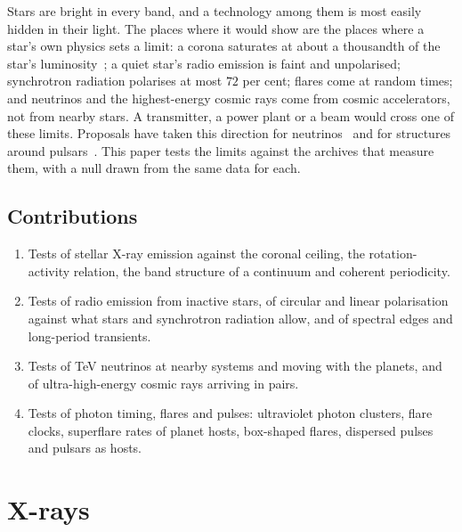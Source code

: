 \documentclass[3p,11pt]{elsarticle}
\begin{document}
Stars are bright in every band, and a technology among them is most easily hidden
in their light. The places where it would show are the places where a star's own
physics sets a limit: a corona saturates at about a thousandth of the star's
luminosity~\cite{Pizzolato2003,Wright2011}; a quiet star's radio emission is faint and
unpolarised; synchrotron radiation polarises at most $72$ per cent; flares come at
random times; and neutrinos and the highest-energy cosmic rays come from cosmic
accelerators, not from nearby stars. A transmitter, a power plant or a beam would cross
one of these limits. Proposals have taken this direction for neutrinos~\cite{Learned2009}
and for structures around pulsars~\cite{Osmanov2016}. This paper tests the limits
against the archives that measure them, with a null drawn from the same data for each.

\subsection{Contributions}
\begin{enumerate}[leftmargin=*,itemsep=1pt]
\item Tests of stellar X-ray emission against the coronal ceiling, the rotation-activity
relation, the band structure of a continuum and coherent periodicity.
\item Tests of radio emission from inactive stars, of circular and linear polarisation
against what stars and synchrotron radiation allow, and of spectral edges and long-period
transients.
\item Tests of TeV neutrinos at nearby systems and moving with the planets, and of
ultra-high-energy cosmic rays arriving in pairs.
\item Tests of photon timing, flares and pulses: ultraviolet photon clusters, flare
clocks, superflare rates of planet hosts, box-shaped flares, dispersed pulses and pulsars
as hosts.
\end{enumerate}

\section{X-rays}\label{sec:xray}
\end{document}

